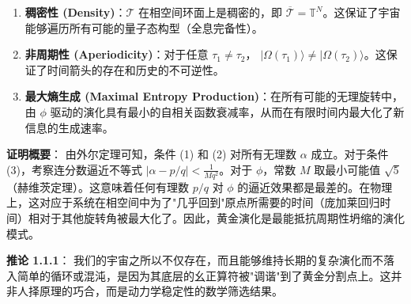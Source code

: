 \begin{enumerate}
\item \textbf{稠密性 (Density)}：$\mathcal{T}$ 在相空间环面上是稠密的，即 $\overline{\mathcal{T}} = \mathbb{T}^N$。这保证了宇宙能够遍历所有可能的量子态构型（全息完备性）。
\item \textbf{非周期性 (Aperiodicity)}：对于任意 $\tau_1 \neq \tau_2$， $|\Omega(\tau_1)\rangle \neq |\Omega(\tau_2)\rangle$。这保证了时间箭头的存在和历史的不可逆性。
\item \textbf{最大熵生成 (Maximal Entropy Production)}：在所有可能的无理旋转中，由 $\phi$ 驱动的演化具有最小的自相关函数衰减率，从而在有限时间内最大化了新信息的生成速率。
\end{enumerate}

\textbf{证明概要}：
由外尔定理可知，条件 (1) 和 (2) 对所有无理数 $\alpha$ 成立。对于条件 (3)，考察连分数逼近不等式 $|\alpha - p/q| < \frac{1}{M q^2}$。对于 $\phi$，常数 $M$ 取最小可能值 $\sqrt{5}$（赫维茨定理）。这意味着任何有理数 $p/q$ 对 $\phi$ 的逼近效果都是最差的。在物理上，这对应于系统在相空间中为了"几乎回到"原点所需要的时间（庞加莱回归时间）相对于其他旋转角被最大化了。因此，黄金演化是最能抵抗周期性坍缩的演化模式。

\textbf{推论 1.1.1}：
我们的宇宙之所以不仅存在，而且能够维持长期的复杂演化而不落入简单的循环或混沌，是因为其底层的幺正算符被"调谐"到了黄金分割点上。这并非人择原理的巧合，而是动力学稳定性的数学筛选结果。
